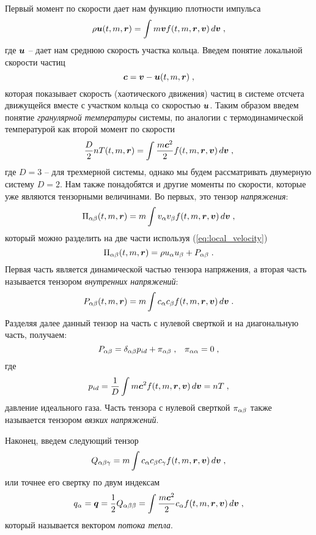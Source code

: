 Первый момент по скорости дает нам функцию плотности импульса
\begin{equation}\label{eq:momentum_density}
  \rho\bm{u}(t,m,\bm{r})=\int m\bm{v} f(t,m,\bm{r},\bm{v})\,d\bm{v}\;,
\end{equation}
где $\bm{u}$ -- дает нам среднюю скорость участка кольца. Введем понятие локальной скорости частиц
\begin{equation}\label{eq:local_velocity}
  \bm{c} = \bm{v}-\bm{u}(t,m,\bm{r})\;,
\end{equation}
которая показывает скорость (хаотического движения) частиц в системе отсчета движущейся вместе с участком кольца со скоростью $\bm{u}$.
Таким образом введем понятие \emph{гранулярной температуры} системы, по аналогии с термодинамической температурой как второй момент
по скорости
\begin{equation}\label{eq:granular_temperature}
  \frac{D}{2}nT(t,m,\bm{r}) = \int\frac{m\bm{c}^2}{2}f(t,m,\bm{r},\bm{v})\,d\bm{v}\;,
\end{equation}
где $D=3$ -- для трехмерной системы, однако мы будем рассматривать двумерную систему $D=2$.
Нам также понадобятся и другие моменты по скорости, которые уже являются тензорными величинами. Во первых, это
тензор \emph{напряжения}:
\begin{equation}
  \Pi_{\alpha\beta}(t,m,\bm{r})=m\int v_\alpha v_\beta f(t,m,\bm{r},\bm{v})\,d\bm{v}\;,
\end{equation}
который можно разделить на две части используя (\ref{eq:local_velocity})
\begin{equation}
  \Pi_{\alpha\beta}(t,m,\bm{r})=\rho u_\alpha u_\beta+P_{\alpha\beta}\;.
\end{equation}
Первая часть является динамической частью тензора напряжения, а вторая часть называется тензором \emph{внутренних напряжений}:
\begin{equation}
  P_{\alpha\beta}(t,m,\bm{r})=m\int c_\alpha c_\beta f(t,m,\bm{r},\bm{v})\,d\bm{v}\;.
\end{equation}
Разделяя далее данный тензор на часть с нулевой сверткой и на диагональную часть, получаем:
\begin{equation}
  P_{\alpha\beta} = \delta_{\alpha\beta}p_{id}+\pi_{\alpha\beta}\;,\;\;\;\pi_{\alpha\alpha}=0\;,
\end{equation}
где 
\begin{equation}
  p_{id}=\frac{1}{D}\int m\bm{c}^2f(t,m,\bm{r},\bm{v})\,d\bm{v}=nT\;,
\end{equation}
давление идеального газа. Часть тензора с нулевой сверткой $\pi_{\alpha\beta}$ также называется тензором \emph{вязких напряжений}.

Наконец, введем следующий тензор
\begin{equation}
  Q_{\alpha\beta\gamma}=m\int c_\alpha c_\beta c_\gamma f(t,m,\bm{r},\bm{v})\,d\bm{v}\;,
\end{equation}
или точнее его свертку по двум индексам
\begin{equation}
  q_\alpha=\bm{q} = \frac{1}{2}Q_{\alpha\beta\beta} = \int \frac{m\bm{c}^2}{2}c_\alpha f(t,m,\bm{r},\bm{v})\,d\bm{v}\;,
\end{equation}
который называется вектором \emph{потока тепла}.

